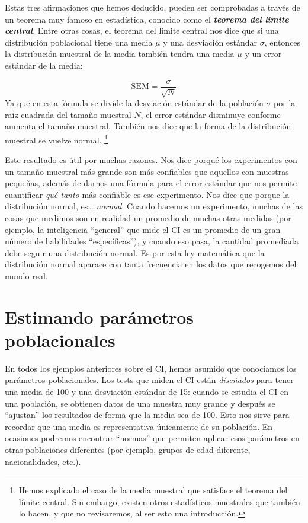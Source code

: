 \documentclass[spanish,]{book}
\let\rmarkdownfootnote\footnote%
\def\footnote{\protect\rmarkdownfootnote}
\begin{document}
Estas tres afirmaciones que hemos deducido, pueden ser comprobadas a
través de un teorema muy famoso en estadística, conocido como el
\textbf{\emph{teorema del límite central}}. Entre otras cosas, el
teorema del límite central nos dice que si una distribución poblacional
tiene una media \(\mu\) y una desviación estándar \(\sigma\), entonces
la distribución muestral de la media también tendra una media \(\mu\) y
un error estándar de la media:

\[
\mbox{SEM} = \frac{\sigma}{ \sqrt{N} }
\] Ya que en esta fórmula se divide la desviación estándar de la
población \(\sigma\) por la raíz cuadrada del tamaño muestral \(N\), el
error estándar disminuye conforme aumenta el tamaño muestral. También
nos dice que la forma de la distribución muestral se vuelve normal.
\footnote{Hemos explicado el caso de la media muestral que satisface el
  teorema del límite central. Sin embargo, existen otros estadísticos
  muestrales que también lo hacen, y que no revisaremos, al ser esto una
  introducción.}

Este resultado es útil por muchas razones. Nos dice porqué los
experimentos con un tamaño muestral más grande son más confiables que
aquellos con muestras pequeñas, además de darnos una fórmula para el
error estándar que nos permite cuantificar \emph{qué tanto} más
confiable es ese experimento. Nos dice que porque la distribución
normal, es\ldots{} \emph{normal}. Cuando hacemos un experimento, muchas
de las cosas que medimos son en realidad un promedio de muchas otras
medidas (por ejemplo, la inteligencia ``general'' que mide el CI es un
promedio de un gran número de habilidades ``específicas''), y cuando eso
pasa, la cantidad promediada debe seguir una distribución normal. Es por
esta ley matemática que la distribución normal aparace con tanta
frecuencia en los datos que recogemos del mundo real.

\section{Estimando parámetros poblacionales}\label{pointestimates}

En todos los ejemplos anteriores sobre el CI, hemos asumido que
conocíamos los parámetros poblacionales. Los tests que miden el CI están
\emph{diseñados} para tener una media de 100 y una desviación estándar
de 15: cuando se estudia el CI en una población, se obtienen datos de
una muestra muy grande y después se ``ajustan'' los resultados de forma
que la media sea de 100. Esto nos sirve para recordar que una media es
representativa únicamente de su población. En ocasiones podremos
encontrar ``normas'' que permiten aplicar esos parámetros en otras
poblaciones diferentes (por ejemplo, grupos de edad diferente,
nacionalidades, etc.).
\end{document}
